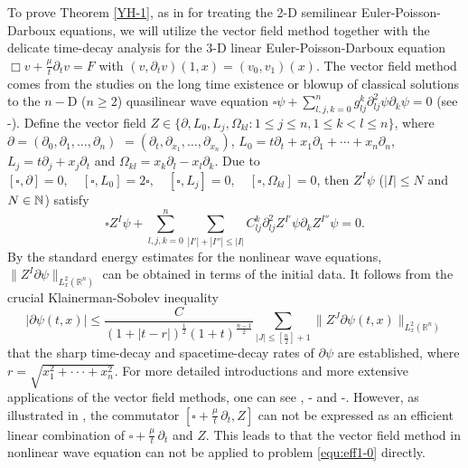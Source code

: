 \documentclass[11pt,twoside]{article}
\newcommand{\p}{\partial}
\newcommand{\f}{\frac}
\newcommand{\ds}{\displaystyle}
\theoremstyle{plain}
\theoremstyle{definition}
\theoremstyle{remark}
\numberwithin{equation}{section}
\begin{document}
To prove Theorem \ref{YH-1}, as in \cite{LY} for treating the 2-D semilinear Euler-Poisson-Darboux equations,
we will utilize the vector field method together with the delicate time-decay analysis for the
3-D  linear Euler-Poisson-Darboux equation $\Box v+\f{\mu}{t}\p_tv=F$ with $(v,\p_tv)(1,x)=(v_0,v_1)(x)$.
The vector field method comes from the studies on the long time existence or blowup of classical solutions to
the $n-$D ($n\ge 2$)  quasilinear wave equation
$\square \psi+\ds\sum_{l,j,k=0}^ng_{lj}^k\p_{lj}^2\psi\p_k\psi=0$ (see \cite{KS}-\cite{KP}).
Define the vector field $Z\in\{\p, L_0, L_j, \Omega_{kl}:  1\le j\le n, 1\le k<l\le n\}$,
where $\p=(\partial_0, \partial_1, \ldots, \partial_n)$ $=(\partial_t, \partial_{x_1}, \ldots, \partial_{x_n})$, $L_0=t \partial_t+x_1 \partial_1+\cdots+x_n \partial_n$,
$L_j=t\partial_j+x_j \partial_t$ and $\Omega_{k l}=x_k \partial_l-x_l \partial_k$.
Due to $[\square, \p]=0,\quad [\square, L_0]=2\square,\quad [\square, L_j]=0, \quad [\square, \Omega_{k l}]=0$,
then $Z^I\psi$ ($|I|\le N$ and $N\in\Bbb N$) satisfy
\begin{equation}\label{YSon-0}
\square Z^I\psi+\sum_{l,j,k=0}^n\sum_{|I'|+|I''|\le|I|}C_{lj}^k\p_{lj}^2Z^{I'}\psi\p_kZ^{I''}\psi=0.
\end{equation}
By the standard energy estimates for the nonlinear wave equations, $\|Z^I\p \psi\|_{L_x^2(\mathbb R^n)}$ can be obtained
in terms of the initial data.
It follows from the crucial Klainerman-Sobolev inequality
\begin{equation}\label{YSon-1}
|\p \psi(t,x)|\le \f{C}{(1+|t-r|)^{\f12}(1+t)^{\f{n-1}{2}}}\ds\sum_{|J|\le [\f{n}{2}]+1}\|Z^J\p \psi(t,x)\|_{L_x^2(\mathbb R^n)}
\end{equation}
that the sharp time-decay and spacetime-decay rates of $\p\psi$ are established, where $r=\sqrt{x_1^2+\cdot\cdot\cdot+x_n^2}$.
For more detailed introductions and more extensive applications of the vector field methods, one can see \cite{H}, \cite{KS}-\cite{KP} and \cite{Li-Chen}-\cite{LX}.
However, as illustrated in \cite{LY},  the commutator $[\square+\f{\mu}{t}\,\p_t, Z]$ can not be expressed as an efficient linear combination of
$\square+\f{\mu}{t}\,\p_t$ and $Z$. This leads to that the vector field method in nonlinear wave equation can not
be applied to problem \eqref{equ:eff1-0} directly.
\end{document}
